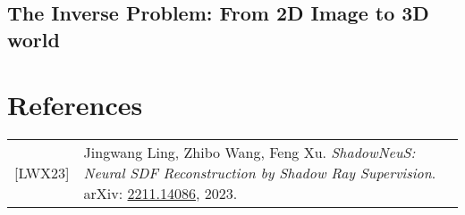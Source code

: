 \documentclass[12pt]{article}
\begin{document}
\subsection{The Inverse Problem: From 2D Image to 3D world}












\newpage
\section*{References}
\begin{tabular}{@{}p{} p{}}
{[LWX23]} & Jingwang Ling, Zhibo Wang, Feng Xu. \textit{ShadowNeuS: Neural SDF Reconstruction by Shadow Ray Supervision}. arXiv: \href{https://arxiv.org/abs/2211.14086}{2211.14086}, 2023.
\end{tabular}
\end{document}
